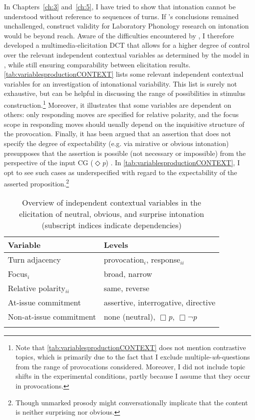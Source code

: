 In Chapters~\ref{ch:3} and~\ref{ch:5}, I have tried to show that intonation cannot be understood without reference to sequences of turns. If \citeauthor{FelixBrasdefer.2010}'s conclusions remained unchallenged, construct validity for Laboratory Phonology research on intonation would be beyond reach. Aware of the difficulties encountered by \citet{FelixBrasdefer.2007,FelixBrasdefer.2010}, I therefore developed a multimedia-elicitation \ac{DCT} that allows for a higher degree of control over the relevant independent contextual variables as determined by the model in , while still ensuring comparability between elicitation results. \autoref{tab:variablesproductionCONTEXT} lists some relevant independent contextual variables for an investigation of intonational variability. This list is surely not exhaustive, but can be helpful in discussing the range of possibilities in stimulus construction.\footnote{Note that \autoref{tab:variablesproductionCONTEXT} does not mention contrastive topics, which is primarily due to the fact that I exclude multiple-\textit{wh}-questions \citep{Dayal.2006,Kellert.2015} from the range of provocations considered. Moreover, I did not include topic shifts in the experimental conditions, partly because I assume that they occur in provocations.} Moreover, it illustrates that some variables are dependent on others: only responding moves are specified for relative polarity, and the focus scope in responding moves should usually depend on the inquisitive structure of the provocation. Finally, it has been argued that an assertion that does not specify the degree of expectability (e.g. via mirative or obvious intonation) presupposes that the assertion is possible (not necessary or impossible) from the perspective of the input \ac{CG} ($\Diamond$\textit{p}) \citep{Reich.2018}. In \autoref{tab:variablesproductionCONTEXT}, I opt to see such cases as underspecified with regard to the expectability of the asserted proposition.\footnote{Though unmarked prosody might conversationally implicate that the content is neither surprising nor obvious.}

\begin{table}
	\begin{tabular}{ll}
	\lsptoprule
		Variable  & Levels\\\midrule
		Turn adjacency & provocation$_{i}$, response$_{ii}$ \\
		Focus$_{i}$ & broad, narrow \\
		Relative polarity$_{ii}$ & same, reverse \\
		At-issue commitment & assertive, interrogative, directive \\
		Non-at-issue commitment & none (neutral), $\Box$\textit{p}, $\Box\neg$\textit{p}\\
	\lspbottomrule 
	\end{tabular}
	\caption{Overview of independent contextual variables in the elicitation of neutral, obvious, and surprise intonation (subscript indices indicate dependencies)\label{tab:variablesproductionCONTEXT}}
\end{table}


